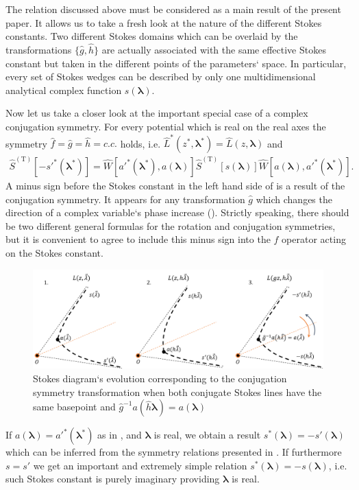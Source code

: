 \documentclass[12pt]{iopart}
\def\S{\widehat{S}}
\def\W{\widehat{W}}
\def\f{\hat{f}}
\def\g{\hat{g}}
\def\h{\hat{h}}
\def\L{\widehat{L}}
\def\lmbd{\bm{\lambda}}
\def\Tp{\mathrm{T}}
\begin{document}
The relation discussed above must be considered as a main result of the present paper.
It allows us to take a fresh look at the nature of the different Stokes constants. 
Two different Stokes domains which can be overlaid by the transformations $\{\g,\h\}$ are 
actually associated with the same effective Stokes constant but taken in the different 
points of the parameters` space. In particular, every set of Stokes wedges can be described 
by only one multidimensional analytical complex function $s(\lmbd)$.

Now let us take a closer look at the important special case of a complex conjugation symmetry. 
For every potential which is real on the real axes the symmetry $\f=\g=\h=c.c.$ holds, 
i.e. $\L^*(z^*,\lmbd^*)=\L(z,\lmbd)$ and
\begin{eqnarray}
\S^{(\Tp)} \left[ -s'^*(\lmbd^*) \right] = 
\W \left[ a'^*(\lmbd^*),a(\lmbd) \right]
\S^{(\Tp)} \left[ s(\lmbd) \right]
\W \left[ a(\lmbd),a'^*(\lmbd^*) \right].
\label{eq:cnjgtn}
\end{eqnarray}
A minus sign before the Stokes constant in the left hand side of  is a result 
of the conjugation symmetry. It appears for any transformation $\g$ which changes the direction 
of a complex variable`s phase increase (). Strictly speaking, there should be two 
different general formulas for the rotation and conjugation symmetries, but it is convenient 
to agree to include this minus sign into the $\f$ operator acting on the Stokes constant.

\begin{figure}
\centering
\noindent
\includegraphics[scale=.5]{stuff/cs.png}
\caption{Stokes diagram`s evolution corresponding to the conjugation symmetry transformation when both conjugate Stokes lines have the same basepoint and $\g^{-1}a(\h\lmbd)=a(\lmbd)$}
\label{fig:cst}
\end{figure} 

If $a(\lmbd)=a'^*(\lmbd^*)$ as in , and $\lmbd$ is real, we obtain a result 
$s^*(\lmbd)=-s'(\lmbd)$ which can be inferred from the symmetry relations presented in \cite{symm}. 
If furthermore $s=s'$ we get an important and extremely simple relation $s^*(\lmbd)=-s(\lmbd)$, i.e. such Stokes constant is purely imaginary providing $\lmbd$ is real.
\end{document}
